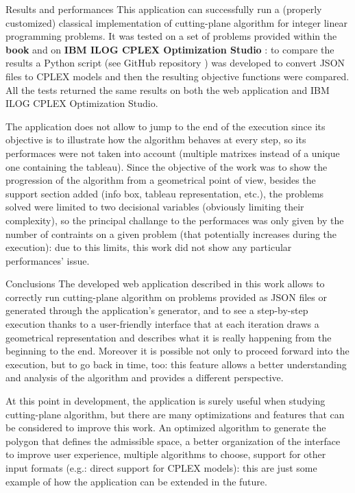 \documentclass[9pt]{extarticle}
\begin{document}
    \begin{section}{Results and performances}
        This application can successfully run a (properly customized) classical implementation of cutting-plane algorithm for integer linear 
        programming problems. 
        It was tested on a set of problems provided within the \textbf{book}\cite{book} and on \textbf{IBM ILOG CPLEX Optimization Studio}
        \cite{web:cplex}: to compare the results a Python script (see GitHub repository \cite{github:project}) was developed to convert JSON files 
        to CPLEX models and then the resulting objective functions were compared. 
        All the tests returned the same results on both the web application and IBM ILOG CPLEX Optimization Studio.

        The application does not allow to jump to the end of the execution since its objective is to illustrate how the algorithm behaves at every 
        step, so its performaces were not taken into account (multiple matrixes instead of a unique one containing the tableau). 
        Since the objective of the work was to show the progression of the algorithm from a geometrical point of view, besides the support section
        added (info box, tableau representation, etc.), the problems solved were limited to two decisional variables (obviously limiting their 
        complexity), so the principal challange to the performaces was only given by the number of contraints on a given problem (that potentially 
        increases during the execution): due to this limits, this work did not show any particular performances' issue.
    \end{section}

    \begin{section}{Conclusions}
        The developed web application described in this work allows to correctly run cutting-plane algorithm on problems provided as JSON files 
        or generated through the application's generator, and to see a step-by-step execution thanks to a user-friendly interface that at each 
        iteration draws a geometrical representation and describes what it is really happening from the beginning to the end. 
        Moreover it is possible not only to proceed forward into the execution, but to go back in time, too: this feature allows a better 
        understanding and analysis of the algorithm and provides a different perspective.

        At this point in development, the application is surely useful when studying cutting-plane algorithm, but there are many optimizations
        and features that can be considered to improve this work. 
        An optimized algorithm to generate the polygon that defines the admissible space, a better organization of the interface to improve 
        user experience, multiple algorithms to choose, support for other input formats (e.g.: direct support for CPLEX models): this are just 
        some example of how the application can be extended in the future.
    \end{section}
\end{document}
